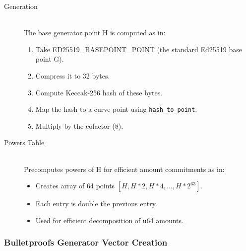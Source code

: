 \begin{description}
\item[Generation] \hfill \\
The base generator point H is computed as in:
\begin{enumerate}
\item Take ED25519\_BASEPOINT\_POINT (the standard Ed25519 base point G).  %
\item Compress it to 32 bytes.  %
\item Compute Keccak-256 hash of these bytes.  %
\item Map the hash to a curve point using \texttt{hash\_to\_point}.  %
\item Multiply by the cofactor (8).  %
\end{enumerate}

\item[Powers Table] \hfill \\
Precomputes powers of H for efficient amount commitments as in:
\begin{itemize}
\item Creates array of 64 points $[H, H*2, H*4, ..., H*2^{63}]$. 
\item Each entry is double the previous entry.  %
\item Used for efficient decomposition of u64 amounts.  %
\end{itemize}
\end{description}

\subsubsection{Bulletproofs Generator Vector Creation}

